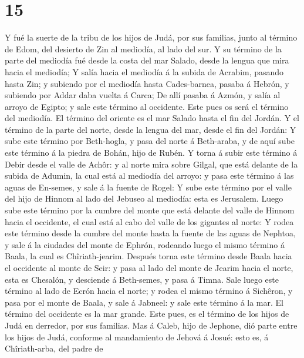 \hypertarget{section-14}{%
\section{15}\label{section-14}}

 Y fué la suerte de la tribu de los hijos de Judá, por sus
familias, junto al término de Edom, del desierto de Zin al mediodía, al
lado del sur.  Y su término de la parte del mediodía fué
desde la costa del mar Salado, desde la lengua que mira hacia el
mediodía;  Y salía hacia el mediodía á la subida de
Acrabim, pasando hasta Zin; y subiendo por el mediodía hasta
Cades-barnea, pasaba á Hebrón, y subiendo por Addar daba vuelta á Carca;
 De allí pasaba á Azmón, y salía al arroyo de Egipto; y
sale este término al occidente. Este pues os será el término del
mediodía.  El término del oriente es el mar Salado hasta
el fin del Jordán. Y el término de la parte del norte, desde la lengua
del mar, desde el fin del Jordán:  Y sube este término por
Beth-hogla, y pasa del norte á Beth-araba, y de aquí sube este término á
la piedra de Bohán, hijo de Rubén.  Y torna á subir este
término á Debir desde el valle de Achôr: y al norte mira sobre Gilgal,
que está delante de la subida de Adumin, la cual está al mediodía del
arroyo: y pasa este término á las aguas de En-semes, y sale á la fuente
de Rogel:  Y sube este término por el valle del hijo de
Hinnom al lado del Jebuseo al mediodía: esta es Jerusalem. Luego sube
este término por la cumbre del monte que está delante del valle de
Hinnom hacia el occidente, el cual está al cabo del valle de los
gigantes al norte:  Y rodea este término desde la cumbre
del monte hasta la fuente de las aguas de Nephtoa, y sale á la ciudades
del monte de Ephrón, rodeando luego el mismo término á Baala, la cual es
Chîriath-jearim.  Después torna este término desde Baala
hacia el occidente al monte de Seir: y pasa al lado del monte de Jearim
hacia el norte, esta es Chesalón, y desciende á Beth-semes, y pasa á
Timna.  Sale luego este término al lado de Ecrón hacia el
norte; y rodea el mismo término á Sichêron, y pasa por el monte de
Baala, y sale á Jabneel: y sale este término á la mar. 
El término del occidente es la mar grande. Este pues, es el término de
los hijos de Judá en derredor, por sus familias.  Mas á
Caleb, hijo de Jephone, dió parte entre los hijos de Judá, conforme al
mandamiento de Jehová á Josué: esto es, á Chîriath-arba, del padre de

